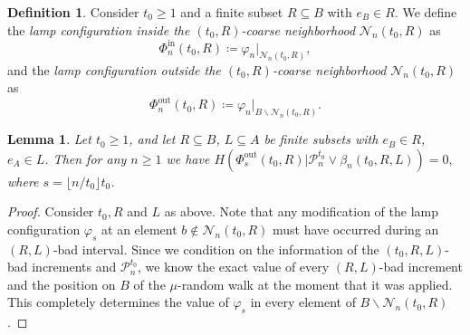 \documentclass[reqno,oneside,11pt]{amsart}
\theoremstyle{plain}
\newtheorem{lem}[thm]{Lemma}
\theoremstyle{definition}
\newtheorem{defn}[thm]{Definition} %
\begin{document}
\begin{defn}\label{def: entropy in and out lamps} Consider $t_0\ge 1$ and a finite subset $R\subseteq B$ with $e_B\in R$. We define the \emph{lamp configuration inside the $(t_0,R)$-coarse neighborhood} $\mathcal{N}_n(t_0,R)$ as
	\begin{equation*} \Phi_n^{\mathrm{in}}(t_0,R)\coloneqq \varphi_n|_{\mathcal{N}_n(t_0,R)},
	\end{equation*}
	and the \emph{lamp configuration outside the $(t_0,R)$-coarse neighborhood} $\mathcal{N}_n(t_0,R)$ as
	\begin{equation*}
		\Phi_{n}^{\mathrm{out}}(t_0,R)\coloneqq \varphi_n|_{B\backslash \mathcal{N}_n(t_0,R)}.
	\end{equation*}
\end{defn}
\begin{lem}\label{lem: lamp config outside coarse neighborhood has small entropy}
	Let $t_0\ge 1$, and let $R\subseteq B$, $L\subseteq A$ be finite subsets with $e_B\in R$, $e_A\in L$. Then for any $n\ge 1$ we have $
		H\left(\Phi_{s}^{\mathrm{out}}(t_0,R)\Big| \mathcal{P}_n^{t_0}\vee \beta_n(t_0,R,L) \right)=0,$ where $s=\lfloor n/t_0\rfloor t_0$. 
\end{lem}
\begin{proof}
	Consider $t_0,R$ and $L$ as above. Note that any modification of the lamp configuration $\varphi_s$ at an element $b\notin \mathcal{N}_n(t_0,R)$ must have occurred during an $(R,L)$-bad interval. Since we condition on the information of the $(t_0,R,L)$-bad increments and $\mathcal{P}_n^{t_0}$, we know the exact value of every $(R,L)$-bad increment and the position on $B$ of the $\mu$-random walk at the moment that it was applied. This completely determines the value of $\varphi_s$ in every element of $B\backslash\mathcal{N}_n(t_0,R)$.
\end{proof}

\end{document}

